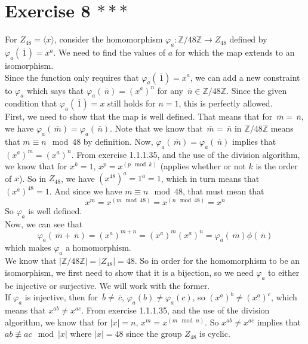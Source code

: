 \documentclass{article}
\newcommand{\Z}{\mathbb{Z}}
\newcommand{\olsi}[1]{\,\overline{\!{#1}}}
\begin{document}
    \section*{Exercise 8 $***$}
    For $Z_{48} = \langle x \rangle$,
    consider the homomorphism $\varphi_a: \Z/48\Z \to Z_{48}$
    defined by $\varphi_a(\olsi{1}) = x^a$.
    We need to find the values of $a$ for which the map extends to
    an isomorphism. \\
    Since the function only requires that $\varphi_a(\olsi{1}) = x^a$,
    we can add a new constraint to $\varphi_a$ which says that 
    $\varphi_a(\olsi{n}) = (x^a)^n$ for any $\olsi{n} \in \Z/48\Z$.
    Since the given condition that $\varphi_a(\olsi{1}) = x$
    still holds for $n = 1$, this is perfectly allowed. \\
    First, we need to show that the map is well defined.
    That means that for $\olsi{m} = \olsi{n}$,
    we have $\varphi_a(\olsi{m}) = \varphi_a(\olsi{n})$.
    Note that we know that $\olsi{m} = \olsi{n}$ in $\Z/48\Z$
    means that $m \equiv n \mod 48$ by definition.
    Now, $\varphi_a(\olsi{m}) = \varphi_a(\olsi{n})$
    implies that $(x^a)^m = (x^a)^n$.
    From exercise 1.1.1.35, and the use of the division
    algorithm, we know that for $x^k = 1$, $x^p = x^{(p \mod k)}$
    (applies whether or not $k$ is the order of $x$).
    So in $Z_{48}$, we have $(x^{48})^a = 1^a = 1$,
    which in turn means that $(x^a)^{48} = 1$.
    And since we have $m \equiv n \mod 48$, that must mean
    that
    \[ x^m = x^{(m \mod 48)} = x^{(n \mod 48)} = x^n \]
    So $\varphi_a$ is well defined. \\
    Now, we can see that
    \[ \varphi_a(\olsi{m} + \olsi{n}) = (x^a)^{m + n}
    = (x^a)^m(x^a)^n
    = \varphi_a(\olsi{m})\phi(\olsi{n})  \]
    which makes $\varphi_a$ a homomorphism. \\
    We know that $|\Z/48\Z| = |Z_{48}| = 48$.
    So in order for the homomorphism to be an isomorphism,
    we first need to show that it is a bijection,
    so we need $\varphi_a$ to either be injective or surjective.
    We will work with the former. \\
    If $\varphi_a$ is injective,
    then for $\olsi{b} \neq \olsi{c}$,
    $\varphi_a(b) \neq \varphi_a(c)$,
    so $(x^a)^b \neq (x^a)^c$,
    which means that $x^{ab} \neq x^{ac}$.
    From exercise 1.1.1.35, and the use of the division
    algorithm, we know that for $|x| = n$, $x^m = x^{(m \mod n)}$.
    So $x^{ab} \neq x^{ac}$ implies that $ab \not\equiv ac \mod |x|$
    where $|x| = 48$ since the group $Z_{48}$ is cyclic.
\end{document}
